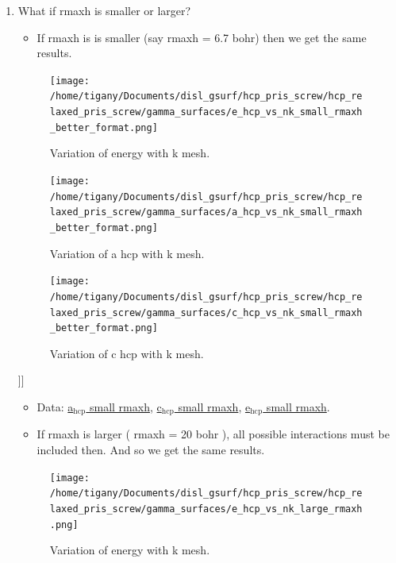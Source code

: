 \documentclass[11pt]{article}
\begin{document}
\begin{enumerate}
\begin{enumerate}
\item What if rmaxh is smaller or larger?
\label{sec-1-2-1-1-1}
\begin{itemize}
\item If rmaxh is is smaller (say rmaxh = 6.7 bohr) then we get the same
results.
\end{itemize}
\begin{figure}[htb]
\centering
\texttt{[image: /home/tigany/Documents/disl\_gsurf/hcp\_pris\_screw/hcp\_relaxed\_pris\_screw/gamma\_surfaces/e\_hcp\_vs\_nk\_small\_rmaxh\_better\_format.png]}
\caption{\label{fig:e_hcp_vs_nk_small_rmaxh.png}Variation of energy with k mesh.}
\end{figure}
\begin{figure}[htb]
\centering
\texttt{[image: /home/tigany/Documents/disl\_gsurf/hcp\_pris\_screw/hcp\_relaxed\_pris\_screw/gamma\_surfaces/a\_hcp\_vs\_nk\_small\_rmaxh\_better\_format.png]}
\caption{\label{fig:a-hcp_vs_nk_small_rmaxh.png}Variation of a hcp with k mesh.}
\end{figure}
\begin{figure}[htb]
\centering
\texttt{[image: /home/tigany/Documents/disl\_gsurf/hcp\_pris\_screw/hcp\_relaxed\_pris\_screw/gamma\_surfaces/c\_hcp\_vs\_nk\_small\_rmaxh\_better\_format.png]}
\caption{\label{fig:c_hcp_vs_nk_small_rmaxh.png}Variation of c hcp with k mesh.}
\end{figure}]]
\begin{itemize}
\item Data: \href{file:///home/tigany/Documents/disl_gsurf/hcp_pris_screw/hcp_relaxed_pris_screw/gamma_surfaces/a_hcp_vs_nk_rmaxh_small.pkl}{a$_{\text{hcp}}$ small rmaxh}, \href{file:///home/tigany/Documents/disl_gsurf/hcp_pris_screw/hcp_relaxed_pris_screw/gamma_surfaces/c_hcp_vs_nk_rmaxh_small.pkl}{c$_{\text{hcp}}$ small rmaxh}, \href{file:///home/tigany/Documents/disl_gsurf/hcp_pris_screw/hcp_relaxed_pris_screw/gamma_surfaces/e_hcp_vs_nk_rmaxh_small.pkl}{e$_{\text{hcp}}$ small rmaxh}.
\item If rmaxh is larger ( rmaxh = 20 bohr ), all possible interactions must
be included then. And so we get the same results.
\end{itemize}
\begin{figure}[htb]
\centering
\texttt{[image: /home/tigany/Documents/disl\_gsurf/hcp\_pris\_screw/hcp\_relaxed\_pris\_screw/gamma\_surfaces/e\_hcp\_vs\_nk\_large\_rmaxh.png]}
\caption{\label{fig:e_hcp_vs_nk_large_rmaxh.png}Variation of energy with k mesh.}

\end{figure}
\end{enumerate}
\end{enumerate}
\end{document}

